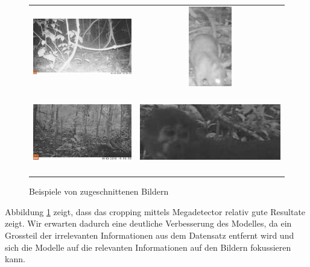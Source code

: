 \documentclass{article}
\begin{document}
\begin{figure}[!h]
\begin{tabular}{cc}
  \includegraphics[height=35mm]{images/example_images/ZJ000268.jpg} & \includegraphics[height=35mm]{images/example_cropped/ZJ000268.jpg} \\
  \includegraphics[height=35mm]{images/example_images/ZJ000014.jpg} & \includegraphics[height=35mm]{images/example_cropped/ZJ000014.jpg}\\
\end{tabular}
\caption{\label{fig:cropped_images_examples}Beispiele von zugeschnittenen Bildern}
\end{figure}

Abbildung \ref{fig:cropped_images_examples} zeigt, dass das cropping mittels Megadetector relativ gute Resultate zeigt. Wir erwarten dadurch eine deutliche Verbesserung des Modelles, da ein Grossteil der irrelevanten Informationen aus dem Datensatz entfernt wird und sich die Modelle auf die relevanten Informationen auf den Bildern fokussieren kann.
\end{document}
